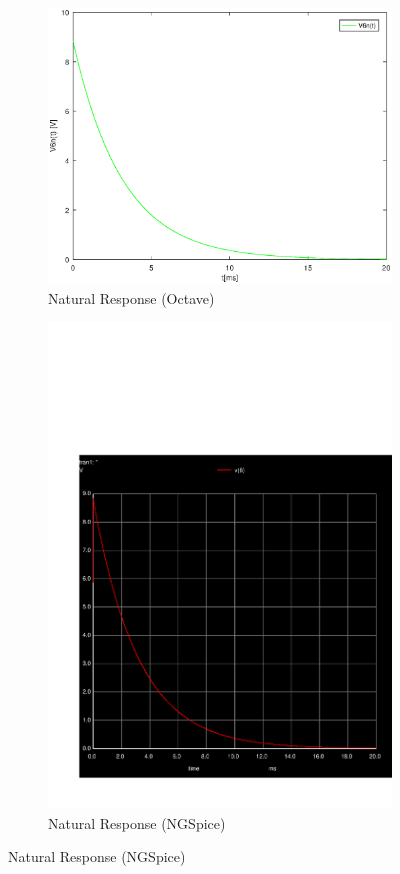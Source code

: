\begin{figure}[H] 
\centering

\begin{subfigure}{0.5\textwidth}
\includegraphics[width=\textwidth]{NaturalResponse.eps}
\caption{Natural Response (Octave)}
\label{fig:first}
\end{subfigure}
\begin{subfigure}{0.42\textwidth}
\includegraphics[width=\textwidth]{sim_3.pdf}
\caption{Natural Response (NGSpice)}
\label{fig:second}
\end{subfigure}

\end{figure}
 
